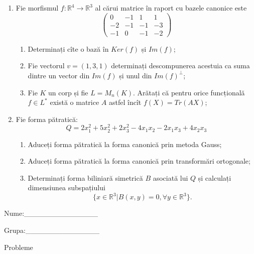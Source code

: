 \documentclass{article}
\begin{document}
\begin{enumerate}
 \item Fie morfismul $f:\mathbb{R}^4 \to \mathbb{R}^3$ al cărui matrice în raport cu bazele canonice este
$$\begin{pmatrix}
0&-1&1&1\\
-2&-1&-1&-3\\
-1&0&-1&-2
\end{pmatrix}$$

\begin{enumerate}
\item Determinați cîte o bază în $Ker(f)$ și $Im(f)$;
\item Fie vectorul $v=(1,3,1)$ determinați descompunerea acestuia ca suma dintre un vector din $Im(f)$ și unul din $Im(f)^\perp$;
\item Fie $K$ un corp și fie $L=M_n(K)$. Arătați că pentru orice funcțională $f \in L^*$ există o matrice $A$ astfel încît $f(X)=Tr(AX)$;
\end{enumerate}
\item Fie forma pătratică:
$$Q= 2x_1^2+5x_2^2+2x_3^2-4x_1x_2-2x_1x_3+4x_2x_3$$

\begin{enumerate}
\item Aduceți forma pătratică la forma canonică prin metoda Gauss;
\item Aduceți forma pătratică la forma canonică prin transformări ortogonale;
\item Determinați forma biliniară simetrică $B$ asociată lui $Q$ și calculați dimensiunea subspațiului
$$\{x \in \mathbb{R}^3 | B(x,y)=0,\forall y \in \mathbb{R}^3\}.$$

\end{enumerate}
\end{enumerate}
\newpage
\begin{flushright}
Nume:\_\_\_\_\_\_\_\_\_\_\_\_\_\_
 
 
Grupa:\_\_\_\_\_\_\_\_\_\_\_\_\_\_
\end{flushright}
\begin{center}
\vspace{2cm}
{\Large Probleme}
\vspace{2cm}
\end{center}
\end{document}
